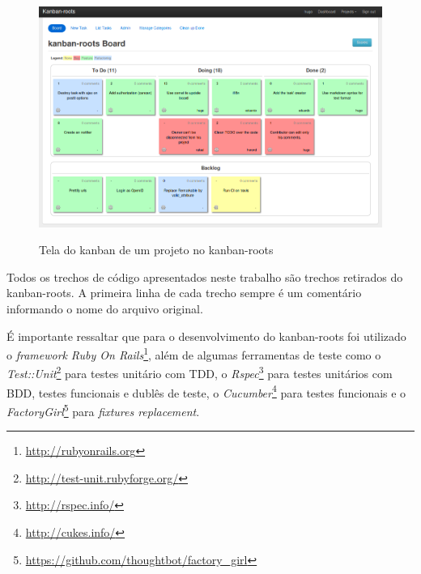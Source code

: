\begin{figure}[h]
  \center
  \caption{Tela do kanban de um projeto no kanban-roots}
  \includegraphics[scale=0.45]{images/kanban-roots}
  \label{img:tela_kaban_roots}
\end{figure}

Todos os trechos de código apresentados neste trabalho são trechos retirados do kanban-roots. A primeira linha de cada trecho sempre é um comentário informando o nome do arquivo original.

É importante ressaltar que para o desenvolvimento do kanban-roots foi utilizado o \textit{framework} \textit{Ruby On Rails}\footnote{\url{http://rubyonrails.org}}, além de algumas ferramentas de teste como o \textit{Test::Unit}\footnote{\url{http://test-unit.rubyforge.org/}} para testes unitário com TDD, o \textit{Rspec}\footnote{\url{http://rspec.info/}} para testes unitários com BDD, testes funcionais e dublês de teste, o \textit{Cucumber}\footnote{\url{http://cukes.info/}} para testes funcionais e o \textit{FactoryGirl}\footnote{\url{https://github.com/thoughtbot/factory_girl}} para \textit{fixtures replacement}.